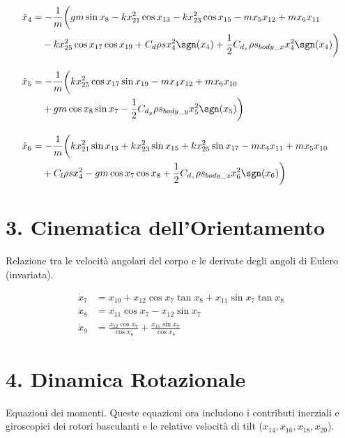 \begin{align}
\dot{x}_4 &= -\frac{1}{m} \bigg( g m \sin x_8 - k x_{21}^2 \cos x_{13} - k x_{23}^2 \cos x_{15} - m x_5 x_{12} + m x_6 x_{11} \notag \\
&\quad - k x_{25}^2 \cos x_{17} \cos x_{19} + C_d \rho s x_4^2 \sgn(x_4) + \frac{1}{2} C_{d_x} \rho s_{body\_x} x_4^2 \sgn(x_4) \bigg) \\[1em]
\dot{x}_5 &= -\frac{1}{m} \bigg( k x_{25}^2 \cos x_{17} \sin x_{19} - m x_4 x_{12} + m x_6 x_{10} \notag \\
&\quad + g m \cos x_8 \sin x_7 - \frac{1}{2} C_{d_y} \rho s_{body\_y} x_5^2 \sgn(x_5) \bigg) \\[1em]
\dot{x}_6 &= -\frac{1}{m} \bigg( k x_{21}^2 \sin x_{13} + k x_{23}^2 \sin x_{15} + k x_{25}^2 \sin x_{17} - m x_4 x_{11} + m x_5 x_{10} \notag \\
&\quad + C_l \rho s x_4^2 - g m \cos x_7 \cos x_8 + \frac{1}{2} C_{d_z} \rho s_{body\_z} x_6^2 \sgn(x_6) \bigg)
\end{align}

\section*{3. Cinematica dell'Orientamento}
Relazione tra le velocità angolari del corpo e le derivate degli angoli di Eulero (invariata).

\begin{align}
\dot{x}_7 &= x_{10} + x_{12} \cos x_7 \tan x_8 + x_{11} \sin x_7 \tan x_8 \\[1em]
\dot{x}_8 &= x_{11} \cos x_7 - x_{12} \sin x_7 \\[1em]
\dot{x}_9 &= \frac{x_{12} \cos x_7}{\cos x_8} + \frac{x_{11} \sin x_7}{\cos x_8}
\end{align}

\section*{4. Dinamica Rotazionale}
Equazioni dei momenti. Queste equazioni ora includono i contributi inerziali e giroscopici dei rotori basculanti e le relative velocità di tilt ($x_{14}, x_{16}, x_{18}, x_{20}$).

